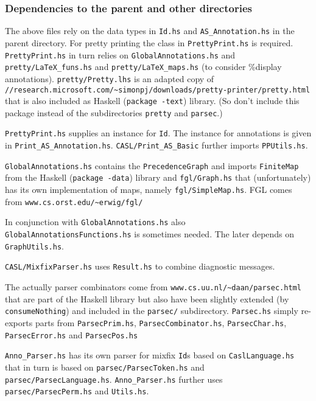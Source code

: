 \documentclass{article}
\begin{document}
\subsubsection*{Dependencies to the parent and other directories}
\label{sec:casl}

The above files rely on the data types in \texttt{Id.hs} and
\texttt{AS\_Annotation.hs} in the parent directory. For pretty
printing the class in \texttt{PrettyPrint.hs} is required.
\texttt{PrettyPrint.hs} in turn relies on
\texttt{GlobalAnnotations.hs} and \texttt{pretty/LaTeX\_funs.hs} and
\texttt{pretty/LaTeX\_maps.hs} (to consider \%display annotations).
\texttt{pretty/Pretty.lhs} is an adapted copy of\\
\texttt{//research.microsoft.com/\~{}simonpj/downloads/pretty-printer/pretty.html}
that is also included as Haskell (\texttt{package -text}) library. (So
don't include this package instead of the subdirectories
\texttt{pretty} and \texttt{parsec}.)

\texttt{PrettyPrint.hs} supplies an instance for \texttt{Id}. The
instance for annotations is given in \texttt{Print\_AS\_Annotation.hs}.
\texttt{CASL/Print\_AS\_Basic} further imports \texttt{PPUtils.hs}.

\texttt{GlobalAnnotations.hs} contains the \texttt{PrecedenceGraph} and
imports \texttt{FiniteMap} from the Haskell (\texttt{package -data})
library and \texttt{fgl/Graph.hs} that (unfortunately) has its
own implementation of maps, namely
\texttt{fgl/SimpleMap.hs}. 
FGL comes from \texttt{www.cs.orst.edu/\~{}erwig/fgl/}

In conjunction with \texttt{GlobalAnnotations.hs} also
\texttt{GlobalAnnotationsFunctions.hs} is sometimes needed. The later
depends on \texttt{GraphUtils.hs}. 

\texttt{CASL/MixfixParser.hs} uses \texttt{Result.hs} to combine
diagnostic messages.

The actually parser combinators come from 
\texttt{www.cs.uu.nl/\~{}daan/parsec.html} that are part of the
Haskell library but also have been slightly extended (by
\texttt{consumeNothing}) and included in the \texttt{parsec/}
subdirectory. \texttt{Parsec.hs} simply re-exports parts from
\texttt{ParsecPrim.hs}, \texttt{ParsecCombinator.hs},
\texttt{ParsecChar.hs}, \texttt{ParsecError.hs} and
\texttt{ParsecPos.hs}

\texttt{Anno\_Parser.hs} has its own parser for mixfix \texttt{Id}s based on
\texttt{CaslLanguage.hs} that in turn is based on
\texttt{parsec/ParsecToken.hs} and \texttt{parsec/ParsecLanguage.hs}.
\texttt{Anno\_Parser.hs} further uses \texttt{parsec/ParsecPerm.hs}
and \texttt{Utils.hs}.
\end{document}
